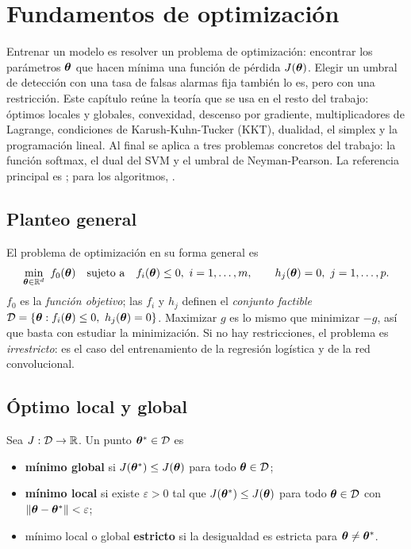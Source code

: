 \chapter{Fundamentos de optimización}
\label{cap:optimizacion}

Entrenar un modelo es resolver un problema de optimización: encontrar los parámetros $\boldsymbol{\theta}$ que hacen
mínima una función de pérdida $J(\boldsymbol{\theta})$. Elegir un umbral de detección con una tasa de falsas alarmas
fija también lo es, pero con una restricción. Este capítulo reúne la teoría que se usa en el resto del
trabajo: óptimos locales y globales, convexidad, descenso por gradiente, multiplicadores de Lagrange,
condiciones de Karush-Kuhn-Tucker (KKT), dualidad, el simplex y la programación lineal. Al final se aplica
a tres problemas concretos del trabajo: la función softmax, el dual del SVM y el umbral de
Neyman-Pearson. La referencia principal es \textcite{boyd2004}; para los algoritmos, \textcite{nocedal2006}.

\section{Planteo general}

El problema de optimización en su forma general es
\begin{equation}
  \min_{\boldsymbol{\theta} \in \mathbb{R}^d}\ f_0(\boldsymbol{\theta})
  \quad\text{sujeto a}\quad
  f_i(\boldsymbol{\theta}) \le 0,\ i = 1,\dots,m, \qquad h_j(\boldsymbol{\theta}) = 0,\ j = 1,\dots,p.
  \label{eq:problema_general}
\end{equation}
$f_0$ es la \emph{función objetivo}; las $f_i$ y $h_j$ definen el \emph{conjunto factible}
$\mathcal{D} = \{\boldsymbol{\theta} : f_i(\boldsymbol{\theta}) \le 0,\ h_j(\boldsymbol{\theta}) = 0\}$. Maximizar $g$ es lo mismo que minimizar $-g$, así
que basta con estudiar la minimización. Si no hay restricciones, el problema es \emph{irrestricto}: es el
caso del entrenamiento de la regresión logística y de la red convolucional.

\section{Óptimo local y global}
\label{sec:local_global}

\begin{definicion}
Sea $J : \mathcal{D} \to \mathbb{R}$. Un punto $\boldsymbol{\theta}^* \in \mathcal{D}$ es
\begin{itemize}
  \item \textbf{mínimo global} si $J(\boldsymbol{\theta}^*) \le J(\boldsymbol{\theta})$ para todo $\boldsymbol{\theta} \in \mathcal{D}$;
  \item \textbf{mínimo local} si existe $\varepsilon > 0$ tal que $J(\boldsymbol{\theta}^*) \le J(\boldsymbol{\theta})$ para todo
        $\boldsymbol{\theta} \in \mathcal{D}$ con $\lVert \boldsymbol{\theta} - \boldsymbol{\theta}^* \rVert < \varepsilon$;
  \item mínimo local o global \textbf{estricto} si la desigualdad es estricta para $\boldsymbol{\theta} \neq \boldsymbol{\theta}^*$.
\end{itemize}
\end{definicion}

